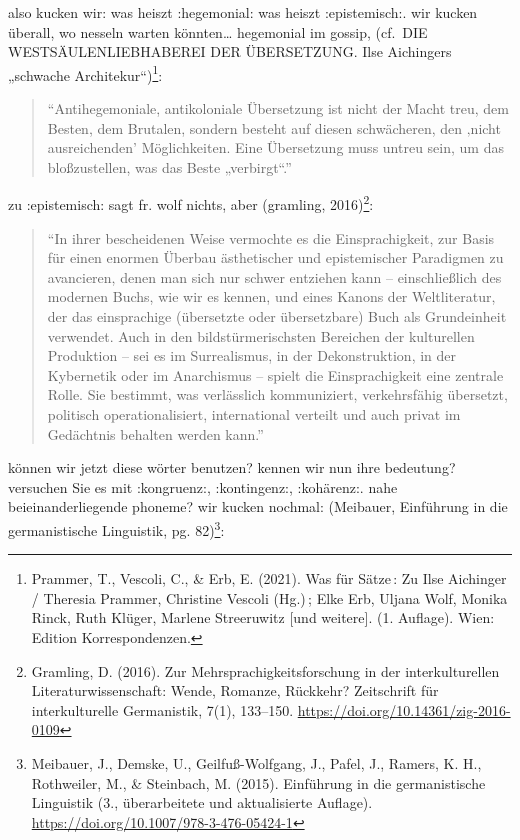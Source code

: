 \documentclass[
  letterpaper,
  DIV=11,
  numbers=noendperiod]{scrartcl}
\begin{document}
also kucken wir: was heiszt :hegemonial: was heiszt :epistemisch:. wir
kucken überall, wo nesseln warten könnten\ldots{} hegemonial im gossip,
(cf.~DIE WESTSÄULENLIEBHABEREI DER ÜBERSETZUNG. Ilse Aichingers
„schwache Architekur``)\footnote{Prammer, T., Vescoli, C., \& Erb, E.
  (2021). Was für Sätze\,: Zu Ilse Aichinger / Theresia Prammer,
  Christine Vescoli (Hg.)\,; Elke Erb, Uljana Wolf, Monika Rinck, Ruth
  Klüger, Marlene Streeruwitz {[}und weitere{]}. (1. Auflage). Wien:
  Edition Korrespondenzen.}:

\begin{quote}
``Antihegemoniale, antikoloniale Übersetzung ist nicht der Macht treu,
dem Besten, dem Brutalen, sondern besteht auf diesen schwächeren, den
‚nicht ausreichenden' Möglichkeiten. Eine Übersetzung muss untreu sein,
um das bloßzustellen, was das Beste „verbirgt``.''
\end{quote}

zu :epistemisch: sagt fr. wolf nichts, aber (gramling, 2016)\footnote{Gramling,
  D. (2016). Zur Mehrsprachigkeitsforschung in der interkulturellen
  Literaturwissenschaft: Wende, Romanze, Rückkehr? Zeitschrift für
  interkulturelle Germanistik, 7(1), 133--150.
  \url{https://doi.org/10.14361/zig-2016-0109}}:

\begin{quote}
``In ihrer bescheidenen Weise vermochte es die Einsprachigkeit, zur
Basis für einen enormen Überbau ästhetischer und epistemischer
Paradigmen zu avancieren, denen man sich nur schwer entziehen kann --
einschließlich des modernen Buchs, wie wir es kennen, und eines Kanons
der Weltliteratur, der das einsprachige (übersetzte oder übersetzbare)
Buch als Grundeinheit verwendet. Auch in den bildstürmerischsten
Bereichen der kulturellen Produktion -- sei es im Surrealismus, in der
Dekonstruktion, in der Kybernetik oder im Anarchismus -- spielt die
Einsprachigkeit eine zentrale Rolle. Sie bestimmt, was verlässlich
kommuniziert, verkehrsfähig übersetzt, politisch operationalisiert,
international verteilt und auch privat im Gedächtnis behalten werden
kann.''
\end{quote}

können wir jetzt diese wörter benutzen? kennen wir nun ihre bedeutung?
versuchen Sie es mit :kongruenz:, :kontingenz:, :kohärenz:. nahe
beieinanderliegende phoneme? wir kucken nochmal: (Meibauer, Einführung
in die germanistische Linguistik, pg. 82)\footnote{Meibauer, J., Demske,
  U., Geilfuß-Wolfgang, J., Pafel, J., Ramers, K. H., Rothweiler, M., \&
  Steinbach, M. (2015). Einführung in die germanistische Linguistik (3.,
  überarbeitete und aktualisierte Auflage).
  \url{https://doi.org/10.1007/978-3-476-05424-1}}:
\end{document}
